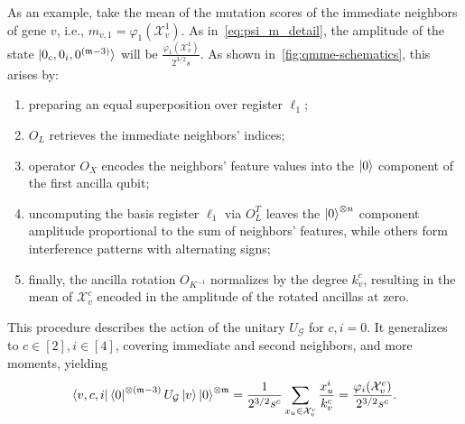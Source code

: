 \documentclass[
  reprint,
  superscriptaddress,
  amsmath,amssymb,
  aps,prl,
]{revtex4-2}
\begin{document}
As an example, take the mean of the mutation scores of the immediate neighbors of gene \(v\), i.e., \(m_{v,1} = \varphi_1(\mathcal{X}_v^1)\). As in~\cref{eq:psi_m_detail}, the amplitude of the state \(\ket{0_c, 0_i, 0^{ (\mathfrak{m} - 3)}}\) will be \(\frac{\varphi_1(\mathcal{X}_v^1)}{2^{3/2} s}\). As shown in~\cref{fig:qmme-schematics}, this arises by:
\begin{enumerate}
    \item preparing an equal superposition over register \(\ell_1\);
    \item \(O_L\) retrieves the immediate neighbors' indices;
    \item operator \(O_X\) encodes the neighbors' feature values into the \(\ket{0}\) component of the first ancilla qubit;
    \item uncomputing the basis register \(\ell_1\) via \(O_L^T\) leaves the \(\ket{0}^{\otimes n}\) component amplitude proportional to the sum of neighbors' features, while others form interference patterns with alternating signs;
    \item finally, the ancilla rotation \(O_{K^{-1}}\) normalizes by the degree \(k_v^c\), resulting in the mean of \(\mathcal X_v^c\) encoded in the amplitude of the rotated ancillas at zero.
\end{enumerate}
\noindent 
This procedure describes the action of the unitary \(U_\mathcal G\) for \(c,i=0\). It generalizes to \(c \!\in\! [2], i\!\in\![4]\), covering immediate and second neighbors, and more moments, yielding
\begin{align}
\bra{v,c,i}\bra{0}^{\otimes (\mathfrak{m}-3)} U_{\mathcal{G}} \ket{v} \ket{0}^{\otimes \mathfrak{m}} = \frac{1}{2^{3/2} s^{c}} \sum_{x_u \in \mathcal X_v^c}\frac{x_u^i}{k_v^c}=\frac{\varphi_i(\mathcal{X}_v^c)}{2^{3/2} s^c}.
\end{align}



\end{document}
